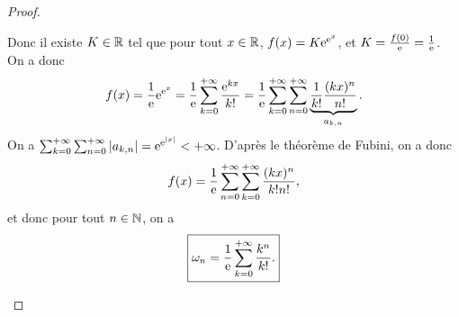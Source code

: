 \documentclass[12pt]{article}
\begin{document}
\begin{proof}
\begin{enumerate}
        Donc il existe $K\in\mathbb{R}$ tel que pour tout $x\in\mathbb{R}$, $f(x)=K\mathrm{e}^{\mathrm{e}^{x}}$, et $K=\frac{f(0)}{\mathrm{e}}=\frac{1}{\mathrm{e}}$. On a donc 
        \begin{equation}
            f(x)=\frac{1}{\mathrm{e}}\mathrm{e}^{\mathrm{e}^{x}}=\frac{1}{\mathrm{e}}\sum_{k=0}^{+\infty}\frac{\mathrm{e}^{kx}}{k!}=\frac{1}{\mathrm{e}}\sum_{k=0}^{+\infty}\sum_{n=0}^{+\infty}\underbrace{\frac{1}{k!}\frac{(kx)^{n}}{n!}}_{a_{k,n}}.
        \end{equation}
        On a $\sum_{k=0}^{+\infty}\sum_{n=0}^{+\infty}\left\lvert a_{k,n}\right\rvert=\mathrm{e}^{\mathrm{e}^{\left\lvert x\right\rvert}}<+\infty$. D'après le théorème de Fubini, on a donc 
        \begin{equation}
            f(x)=\frac{1}{\mathrm{e}}\sum_{n=0}^{+\infty}\sum_{k=0}^{+\infty}\frac{(kx)^{n}}{k!n!},
        \end{equation}
        et donc pour tout $n\in\mathbb{N}$, on a 
        \begin{equation}
            \boxed{
                \omega_{n}=\frac{1}{\mathrm{e}}\sum_{k=0}^{+\infty}\frac{k^{n}}{k!}.
            }
        \end{equation}
    \end{enumerate}
\end{proof}
\end{document}
